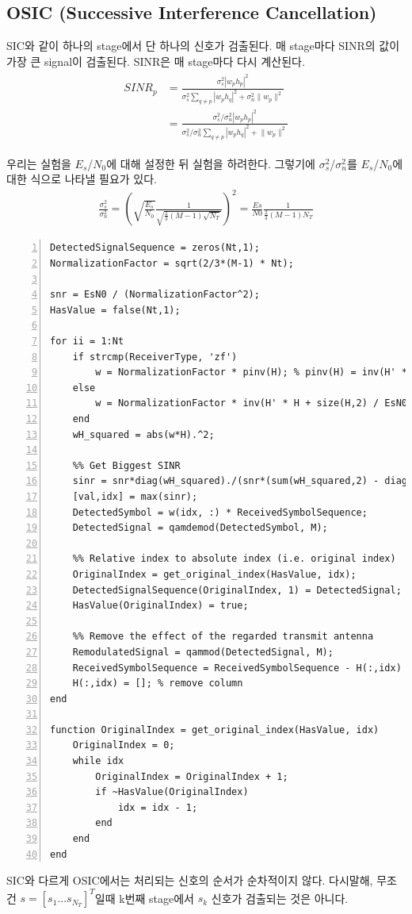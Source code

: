 \documentclass{article}
\begin{document}
\subsection{OSIC (Successive Interference Cancellation)}
SIC와 같이 하나의 stage에서 단 하나의 신호가 검출된다. 매 stage마다 SINR의 값이 가장 큰 signal이 검출된다. SINR은 매 stage마다 다시 계산된다.
\begin{gather}
\begin{split}
SINR_p &= \frac{\sigma_s^2 |w_p h_p|^2}{\sigma_s^2 \sum_{q\neq p} |w_p h_q|^2 + \sigma_n^2 \lVert w_p \rVert^2}\\
&=\frac{\sigma_s^2/\sigma_n^2 |w_p h_p|^2}{\sigma_s^2/\sigma_n^2 \sum_{q\neq p} |w_p h_q|^2 + \lVert w_p \rVert^2}
\end{split}
\end{gather}

우리는 실험을 $E_s$/$N_0$에 대해 설정한 뒤 실험을 하려한다. 그렇기에 $\sigma_s^2$/$\sigma_n^2$를 $E_s$/$N_0$에 대한 식으로 나타낼 필요가 있다.
\begin{gather}
\frac{\sigma_s^2}{\sigma_n^2}=\left( \sqrt{\frac{E_s}{N_0}} \frac{1}{\sqrt{\frac{2}{3}(M-1)\sqrt{N_T}}}\right)^2
=\frac{Es}{N0} \frac{1}{\frac{2}{3}(M-1) N_T}
\end{gather}

\begin{lstlisting}[style=Matlab-editor, frame=single, numbers=left,]
DetectedSignalSequence = zeros(Nt,1);
NormalizationFactor = sqrt(2/3*(M-1) * Nt);

snr = EsN0 / (NormalizationFactor^2);
HasValue = false(Nt,1);

for ii = 1:Nt
    if strcmp(ReceiverType, 'zf')
        w = NormalizationFactor * pinv(H); % pinv(H) = inv(H' * H) * H'
    else
        w = NormalizationFactor * inv(H' * H + size(H,2) / EsN0 * eye(size(H,2))) * H';
    end
    wH_squared = abs(w*H).^2;
    
    %% Get Biggest SINR
    sinr = snr*diag(wH_squared)./(snr*(sum(wH_squared,2) - diag(wH_squared))+sum(abs(w).^2,2));
    [val,idx] = max(sinr);
    DetectedSymbol = w(idx, :) * ReceivedSymbolSequence;
    DetectedSignal = qamdemod(DetectedSymbol, M);

    %% Relative index to absolute index (i.e. original index)
    OriginalIndex = get_original_index(HasValue, idx);
    DetectedSignalSequence(OriginalIndex, 1) = DetectedSignal;
    HasValue(OriginalIndex) = true;

    %% Remove the effect of the regarded transmit antenna
    RemodulatedSignal = qammod(DetectedSignal, M);
    ReceivedSymbolSequence = ReceivedSymbolSequence - H(:,idx) * RemodulatedSignal;
    H(:,idx) = []; % remove column
end

function OriginalIndex = get_original_index(HasValue, idx)
    OriginalIndex = 0;
    while idx
        OriginalIndex = OriginalIndex + 1;
        if ~HasValue(OriginalIndex)
            idx = idx - 1;
        end
    end
end
\end{lstlisting}
SIC와 다르게 OSIC에서는 처리되는 신호의 순서가 순차적이지 않다. 다시말해, 무조건 $s=[s_1 ... s_{N_T}]^T$일때 k번째 stage에서 $s_k$ 신호가 검출되는 것은 아니다.\\
\end{document}
